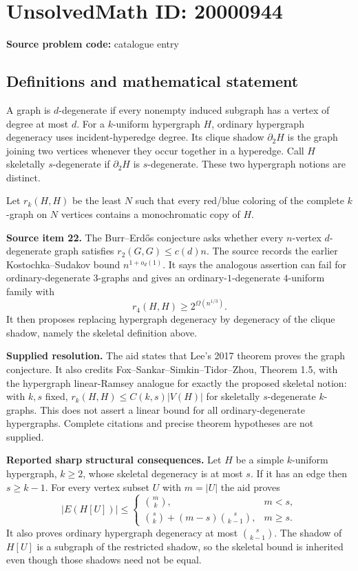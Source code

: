 \documentclass[11pt]{article}
\begin{document}
\section*{UnsolvedMath ID: 20000944}
\textbf{Source problem code:} catalogue entry
\subsection{Definitions and mathematical statement}
A graph is $d$-degenerate if every nonempty induced subgraph has a vertex of degree at most $d$. For a $k$-uniform hypergraph $H$, ordinary hypergraph degeneracy uses incident-hyperedge degree. Its clique shadow $\partial_2H$ is the graph joining two vertices whenever they occur together in a hyperedge. Call $H$ skeletally $s$-degenerate if $\partial_2H$ is $s$-degenerate. These two hypergraph notions are distinct.

Let $r_k(H,H)$ be the least $N$ such that every red/blue coloring of the complete $k$-graph on $N$ vertices contains a monochromatic copy of $H$.

\textbf{Source item 22.} The Burr--Erd\H{o}s conjecture asks whether every $n$-vertex $d$-degenerate graph satisfies $r_2(G,G)\leq c(d)n$. The source records the earlier Kostochka--Sudakov bound $n^{1+o_d(1)}$. It says the analogous assertion can fail for ordinary-degenerate $3$-graphs and gives an ordinary-$1$-degenerate $4$-uniform family with
\[
 r_4(H,H)\geq2^{\Omega(n^{1/3})}.
\]
It then proposes replacing hypergraph degeneracy by degeneracy of the clique shadow, namely the skeletal definition above.

\textbf{Supplied resolution.} The aid states that Lee's 2017 theorem proves the graph conjecture. It also credits Fox--Sankar--Simkin--Tidor--Zhou, Theorem 1.5, with the hypergraph linear-Ramsey analogue for exactly the proposed skeletal notion: with $k,s$ fixed, $r_k(H,H)\leq C(k,s)|V(H)|$ for skeletally $s$-degenerate $k$-graphs. This does not assert a linear bound for all ordinary-degenerate hypergraphs. Complete citations and precise theorem hypotheses are not supplied.

\textbf{Reported sharp structural consequences.} Let $H$ be a simple $k$-uniform hypergraph, $k\geq2$, whose skeletal degeneracy is at most $s$. If it has an edge then $s\geq k-1$. For every vertex subset $U$ with $m=|U|$ the aid proves
\[
 |E(H[U])|\leq
 \begin{cases}
 \binom mk,&m<s,\\
 \binom sk+(m-s)\binom{s}{k-1},&m\geq s.
 \end{cases}
\]
It also proves ordinary hypergraph degeneracy at most $\binom{s}{k-1}$. The shadow of $H[U]$ is a subgraph of the restricted shadow, so the skeletal bound is inherited even though those shadows need not be equal.
\end{document}
